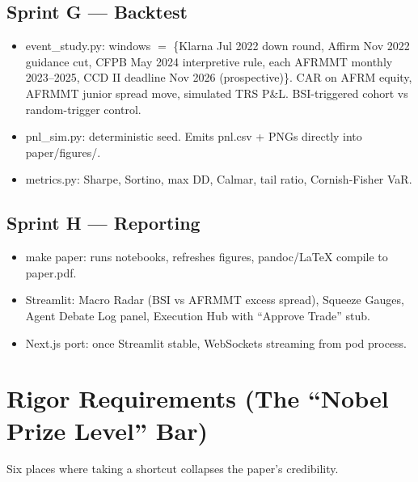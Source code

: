 \documentclass[11pt]{article}
\newcommand{\inlinecode}[1]{{\ttfamily\small #1}}
\begin{document}
\subsection{Sprint G --- Backtest}
\begin{itemize}
  \item \inlinecode{event\_study.py}: windows $=$ \{Klarna Jul 2022 down round, Affirm Nov 2022 guidance cut, CFPB May 2024 interpretive rule, each AFRMMT monthly 2023--2025, CCD II deadline Nov 2026 (prospective)\}. CAR on AFRM equity, AFRMMT junior spread move, simulated TRS P\&L. BSI-triggered cohort vs random-trigger control.
  \item \inlinecode{pnl\_sim.py}: deterministic seed. Emits \inlinecode{pnl.csv} + PNGs directly into \inlinecode{paper/figures/}.
  \item \inlinecode{metrics.py}: Sharpe, Sortino, max DD, Calmar, tail ratio, Cornish-Fisher VaR.
\end{itemize}

\subsection{Sprint H --- Reporting}
\begin{itemize}
  \item \inlinecode{make paper}: runs notebooks, refreshes figures, pandoc/LaTeX compile to \inlinecode{paper.pdf}.
  \item Streamlit: Macro Radar (BSI vs AFRMMT excess spread), Squeeze Gauges, Agent Debate Log panel, Execution Hub with ``Approve Trade'' stub.
  \item Next.js port: once Streamlit stable, WebSockets streaming from pod process.
\end{itemize}

\section{Rigor Requirements (The ``Nobel Prize Level'' Bar)}

Six places where taking a shortcut collapses the paper's credibility.
\end{document}
